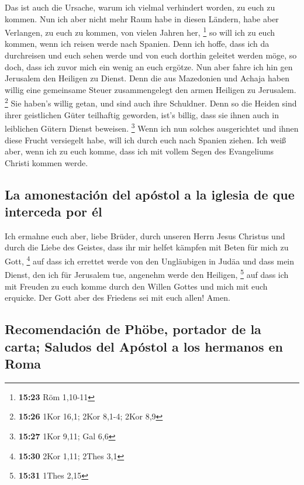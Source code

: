  Das ist auch die Ursache, warum ich vielmal verhindert
worden, zu euch zu kommen.  Nun ich aber nicht mehr Raum
habe in diesen Ländern, habe aber Verlangen, zu euch zu kommen, von
vielen Jahren her, \footnote{\textbf{15:23} Röm 1,10-11} 
so will ich zu euch kommen, wenn ich reisen werde nach Spanien. Denn ich
hoffe, dass ich da durchreisen und euch sehen werde und von euch dorthin
geleitet werden möge, so doch, dass ich zuvor mich ein wenig an euch
ergötze.  Nun aber fahre ich hin gen Jerusalem den
Heiligen zu Dienst.  Denn die aus Mazedonien und Achaja
haben willig eine gemeinsame Steuer zusammengelegt den armen Heiligen zu
Jerusalem. \footnote{\textbf{15:26} 1Kor 16,1; 2Kor 8,1-4; 2Kor 8,9}
 Sie haben's willig getan, und sind auch ihre Schuldner.
Denn so die Heiden sind ihrer geistlichen Güter teilhaftig geworden,
ist's billig, dass sie ihnen auch in leiblichen Gütern Dienst beweisen.
\footnote{\textbf{15:27} 1Kor 9,11; Gal 6,6}  Wenn ich
nun solches ausgerichtet und ihnen diese Frucht versiegelt habe, will
ich durch euch nach Spanien ziehen.  Ich weiß aber, wenn
ich zu euch komme, dass ich mit vollem Segen des Evangeliums Christi
kommen werde.

\hypertarget{la-amonestaciuxf3n-del-apuxf3stol-a-la-iglesia-de-que-interceda-por-uxe9l}{%
\subsection{La amonestación del apóstol a la iglesia de que interceda
por
él}\label{la-amonestaciuxf3n-del-apuxf3stol-a-la-iglesia-de-que-interceda-por-uxe9l}}

 Ich ermahne euch aber, liebe Brüder, durch unseren Herrn
Jesus Christus und durch die Liebe des Geistes, dass ihr mir helfet
kämpfen mit Beten für mich zu Gott, \footnote{\textbf{15:30} 2Kor 1,11;
  2Thes 3,1}  auf dass ich errettet werde von den
Ungläubigen in Judäa und dass mein Dienst, den ich für Jerusalem tue,
angenehm werde den Heiligen, \footnote{\textbf{15:31} 1Thes 2,15}
 auf dass ich mit Freuden zu euch komme durch den Willen
Gottes und mich mit euch erquicke.  Der Gott aber des
Friedens sei mit euch allen! Amen.

\hypertarget{recomendaciuxf3n-de-phuxf6be-portador-de-la-carta-saludos-del-apuxf3stol-a-los-hermanos-en-roma}{%
\subsection{Recomendación de Phöbe, portador de la carta; Saludos del
Apóstol a los hermanos en
Roma}\label{recomendaciuxf3n-de-phuxf6be-portador-de-la-carta-saludos-del-apuxf3stol-a-los-hermanos-en-roma}}

